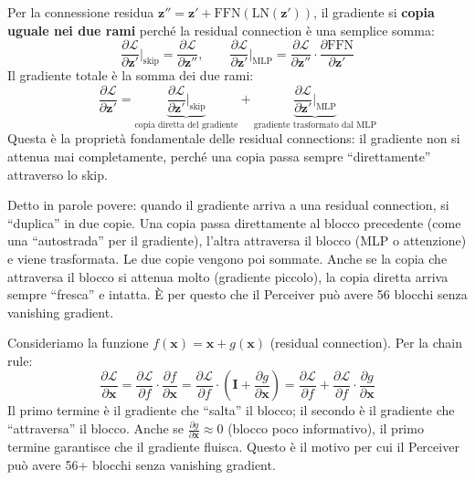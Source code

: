 \documentclass[12pt,a4paper]{article}
\begin{document}
Per la connessione residua $\mathbf{z}'' = \mathbf{z}' + \text{FFN}(\text{LN}(\mathbf{z}'))$, il gradiente si \textbf{copia uguale nei due rami} perch\'e la residual connection \`e una semplice somma:
\[
    \frac{\partial \mathcal{L}}{\partial \mathbf{z}'}\bigg|_{\text{skip}} = \frac{\partial \mathcal{L}}{\partial \mathbf{z}''}, \qquad \frac{\partial \mathcal{L}}{\partial \mathbf{z}'}\bigg|_{\text{MLP}} = \frac{\partial \mathcal{L}}{\partial \mathbf{z}''} \cdot \frac{\partial \text{FFN}}{\partial \mathbf{z}'}
\]
Il gradiente totale \`e la somma dei due rami:
\[
    \frac{\partial \mathcal{L}}{\partial \mathbf{z}'} = \underbrace{\frac{\partial \mathcal{L}}{\partial \mathbf{z}'}\bigg|_{\text{skip}}}_{\text{copia diretta del gradiente}} + \underbrace{\frac{\partial \mathcal{L}}{\partial \mathbf{z}'}\bigg|_{\text{MLP}}}_{\text{gradiente trasformato dal MLP}}
\]
Questa \`e la propriet\`a fondamentale delle residual connections: il gradiente non si attenua mai completamente, perch\'e una copia passa sempre ``direttamente'' attraverso lo skip.

\begin{notabox}
Detto in parole povere: quando il gradiente arriva a una residual connection, si ``duplica'' in due copie. Una copia passa direttamente al blocco precedente (come una ``autostrada'' per il gradiente), l'altra attraversa il blocco (MLP o attenzione) e viene trasformata. Le due copie vengono poi sommate. Anche se la copia che attraversa il blocco si attenua molto (gradiente piccolo), la copia diretta arriva sempre ``fresca'' e intatta. \`E per questo che il Perceiver pu\`o avere 56 blocchi senza vanishing gradient.
\end{notabox}

\begin{notabox}
Consideriamo la funzione $f(\mathbf{x}) = \mathbf{x} + g(\mathbf{x})$ (residual connection). Per la chain rule:
\[
    \frac{\partial \mathcal{L}}{\partial \mathbf{x}} = \frac{\partial \mathcal{L}}{\partial f} \cdot \frac{\partial f}{\partial \mathbf{x}} = \frac{\partial \mathcal{L}}{\partial f} \cdot \left(\mathbf{I} + \frac{\partial g}{\partial \mathbf{x}}\right) = \frac{\partial \mathcal{L}}{\partial f} + \frac{\partial \mathcal{L}}{\partial f} \cdot \frac{\partial g}{\partial \mathbf{x}}
\]
Il primo termine \`e il gradiente che ``salta'' il blocco; il secondo \`e il gradiente che ``attraversa'' il blocco. Anche se $\frac{\partial g}{\partial \mathbf{x}} \approx 0$ (blocco poco informativo), il primo termine garantisce che il gradiente fluisca. Questo \`e il motivo per cui il Perceiver pu\`o avere 56+ blocchi senza vanishing gradient.
\end{notabox}
\end{document}
